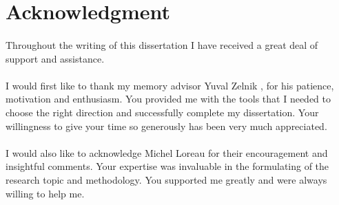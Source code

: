 \documentclass{article}
\begin{document}
\newpage
\paragraph{}
\tableofcontents



\newpage
\listoffigures









\newpage
\section*{Acknowledgment}


\paragraph{}
Throughout the writing of this dissertation I have received a great deal of support and assistance.

\paragraph{}
I would first like to thank my memory advisor Yuval Zelnik , for his patience, motivation and enthusiasm. You provided me with the tools that I needed to choose the right direction and successfully complete my dissertation. Your willingness to give your time so generously has been very much appreciated. 

\paragraph{}
I would also like to acknowledge Michel Loreau for their encouragement and insightful comments. Your expertise was invaluable in the formulating of the research topic and methodology. You supported me greatly and were always willing to help me.
\end{document}
